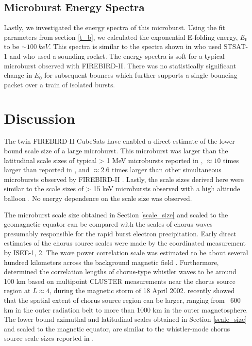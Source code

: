 \documentclass[draft, linenumbers]{agujournal}
\begin{document}
\subsection{Microburst Energy Spectra}
Lastly, we investigated the energy spectra of this microburst. Using the fit parameters from section \ref{t_b}, we calculated the exponential E-folding energy, $E_0$ to be $\sim 100 \ keV$. This spectra is similar to the spectra shown in \citet{Lee2005} who used STSAT-1 and \citet{Datta1997} who used a sounding rocket. The energy spectra is soft for a typical microburst observed with FIREBIRD-II. There was no statistically significant change in $E_0$ for subsequent bounces which further supports a single bouncing packet over a train of isolated bursts.

\section{Discussion} \label{discussion}
The twin FIREBIRD-II CubeSats have enabled a direct estimate of the lower bound scale size of a large microburst. This microburst was larger than the latitudinal scale sizes of typical > 1 MeV microbursts reported in \citet{Blake1996}, $\approx 10$ times larger than reported in \citet{Dietrich2010}, and $\approx 2.6$ times larger than other simultaneous microbursts observed by FIREBIRD-II \citep{Crew2016}. Lastly, the scale sizes derived here were similar to the scale sizes of > 15 keV microbursts observed with a high altitude balloon \citep{Parks1967}. No energy dependence on the scale size was observed.

The microburst scale size obtained in Section \ref{scale_size} and scaled to the geomagnetic equator can be compared with the scales of chorus waves presumably responsible for the rapid burst electron precipitation. Early direct estimates of the chorus source scales were made by the coordinated measurement by ISEE-1, 2. The wave power correlation scale was estimated to be about several hundred kilometers across the background magnetic field \citep{Gurnett1979}. Furthermore, \citet{Santolik2003} determined the correlation lengths of chorus-type whistler waves to be around 100 km based on multipoint CLUSTER  measurements near the chorus source region at $L \approx 4$, during the magnetic storm of 18 April 2002. \citet{Agapitov2010, Agapitov2011b, Agapitov2017a} recently showed that the spatial extent of chorus source region can be larger, ranging from ~600 km in the outer radiation belt to more than 1000 km in the outer magnetosphere. The lower bound azimuthal and latitudinal scales obtained in Section \ref{scale_size} and scaled to the magnetic equator, are similar to the whistler-mode chorus source scale sizes reported in \citet{Agapitov2011b, Agapitov2017a}. 
\end{document}
